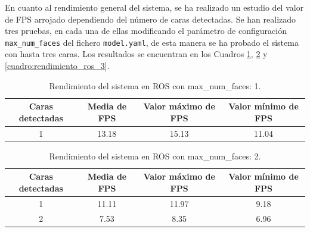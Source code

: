 En cuanto al rendimiento general del sistema, se ha realizado un estudio del valor de FPS arrojado dependiendo del número de caras detectadas. Se han realizado tres pruebas, en cada una de ellas modificando el parámetro de configuración \verb|max_num_faces| del fichero \verb|model.yaml|, de esta manera se ha probado el sistema con hasta tres caras. Los resultados se encuentran en los Cuadros \ref{cuadro:rendimiento_ros_1}, \ref{cuadro:rendimiento_ros_2} y \ref{cuadro:rendimiento_ros_3}.\\

\begin{table}[H]
\begin{center}
\begin{adjustbox}{max width=\textwidth}
\begin{tabular}{|c|c|c|c|}
     \hline
    \textbf{Caras detectadas} & \textbf{Media de FPS} & \textbf{Valor máximo de FPS} & \textbf{Valor mínimo de FPS}\\
    \hline
     1 & 13.18 & 15.13 & 11.04\\
     \hline
 \end{tabular}
 \end{adjustbox}
 \captionsetup{justification=centering}
\caption{Rendimiento del sistema en ROS con max\_num\_faces: 1.}
\label{cuadro:rendimiento_ros_1}
\end{center}
\end{table}

\begin{table}[H]
\begin{center}
\begin{adjustbox}{max width=\textwidth}
\begin{tabular}{|c|c|c|c|}
     \hline
    \textbf{Caras detectadas} & \textbf{Media de FPS} & \textbf{Valor máximo de FPS} & \textbf{Valor mínimo de FPS}\\
    \hline
     1 & 11.11 & 11.97 & 9.18\\
     2 & 7.53 & 8.35 & 6.96\\
     \hline
 \end{tabular}
 \end{adjustbox}
 \captionsetup{justification=centering}
\caption{Rendimiento del sistema en ROS con max\_num\_faces: 2.}
\label{cuadro:rendimiento_ros_2}
\end{center}
\end{table}


